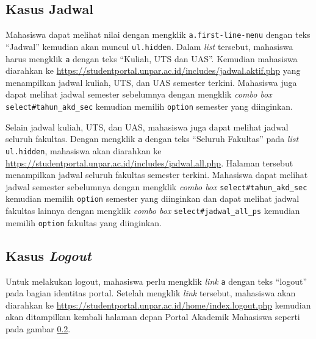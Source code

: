 \subsection{Kasus Jadwal}
Mahasiswa dapat melihat nilai dengan mengklik \texttt{a.first-line-menu} dengan teks ``Jadwal'' kemudian akan muncul \texttt{ul.hidden}. Dalam \textit{list} tersebut, mahasiswa harus mengklik \texttt{a} dengan teks ``Kuliah, UTS dan UAS''. Kemudian mahasiswa diarahkan ke \url{https://studentportal.unpar.ac.id/includes/jadwal.aktif.php} yang menampilkan jadwal kuliah, UTS, dan UAS semester terkini. Mahasiswa juga dapat melihat jadwal semester sebelumnya dengan mengklik \textit{combo box} \texttt{select\#tahun\_akd\_sec} kemudian memilih \texttt{option} semester yang diinginkan.

Selain jadwal kuliah, UTS, dan UAS, mahasiswa juga dapat melihat jadwal seluruh fakultas. Dengan mengklik \texttt{a} dengan teks ``Seluruh Fakultas'' pada \textit{list} \texttt{ul.hidden}, mahasiswa akan diarahkan ke \url{https://studentportal.unpar.ac.id/includes/jadwal.all.php}. Halaman tersebut menampilkan jadwal seluruh fakultas semester terkini. Mahasiswa dapat melihat jadwal semester sebelumnya dengan mengklik \textit{combo box} \texttt{select\#tahun\_akd\_sec} kemudian memilih \texttt{option} semester yang diinginkan dan dapat melihat jadwal fakultas lainnya dengan mengklik \textit{combo box} \texttt{select\#jadwal\_all\_ps} kemudian memilih \texttt{option} fakultas yang diinginkan.

\subsection{Kasus \textit{Logout}}
Untuk melakukan logout, mahasiswa perlu mengklik \textit{link} \texttt{a} dengan teks ``logout'' pada bagian identitas portal. Setelah mengklik \textit{link} tersebut, mahasiswa akan diarahkan ke \url{https://studentportal.unpar.ac.id/home/index.logout.php} kemudian akan ditampilkan kembali halaman depan Portal Akademik Mahasiswa seperti pada gambar \ref{}.

